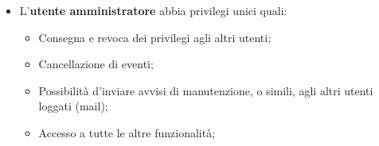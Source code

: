 \documentclass{article}
\begin{document}
\begin{description}
\begin{itemize}
\begin{itemize}
                  \end{itemize}
            \item L'\textbf{utente amministratore} abbia privilegi unici quali:
                  \begin{itemize}
                      \item Consegna e revoca dei privilegi agli altri utenti;
                      \item Cancellazione di eventi;
                      \item Possibilità d'inviare avvisi di manutenzione, o simili, agli altri utenti loggati (mail);
                      \item Accesso a tutte le altre funzionalità;
                  \end{itemize}
        \end{itemize}
\end{description}
\clearpage
\end{document}
